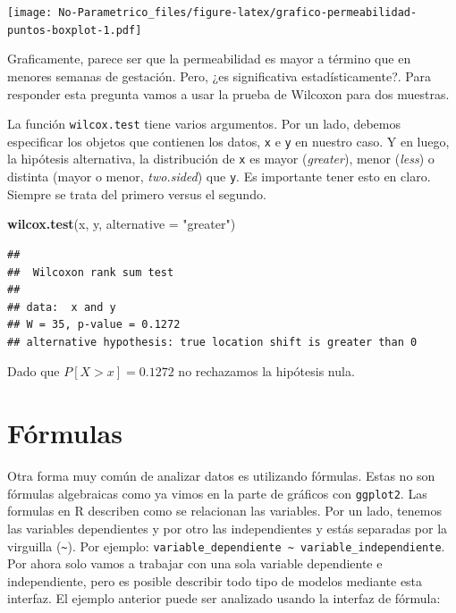 \documentclass[]{book}
\newenvironment{Shaded}{\begin{snugshade}}{\end{snugshade}}
\newcommand{\DataTypeTok}[1]{\textcolor[rgb]{0.13,0.29,0.53}{#1}}
\newcommand{\KeywordTok}[1]{\textcolor[rgb]{0.13,0.29,0.53}{\textbf{#1}}}
\newcommand{\NormalTok}[1]{#1}
\newcommand{\StringTok}[1]{\textcolor[rgb]{0.31,0.60,0.02}{#1}}
\theoremstyle{definition}
\theoremstyle{definition}
\theoremstyle{definition}
\theoremstyle{remark}
\begin{document}
\texttt{[image: No-Parametrico\_files/figure-latex/grafico-permeabilidad-puntos-boxplot-1.pdf]}

Graficamente, parece ser que la permeabilidad es mayor a término que en
menores semanas de gestación. Pero, ¿es significativa estadísticamente?.
Para responder esta pregunta vamos a usar la prueba de Wilcoxon para dos
muestras.

La función \texttt{wilcox.test} tiene varios argumentos. Por un lado,
debemos especificar los objetos que contienen los datos, \texttt{x} e
\texttt{y} en nuestro caso. Y en luego, la hipótesis alternativa, la
distribución de \texttt{x} es mayor (\emph{greater}), menor
(\emph{less}) o distinta (mayor o menor, \emph{two.sided}) que
\texttt{y}. Es importante tener esto en claro. Siempre se trata del
primero versus el segundo.

\begin{Shaded}
\begin{Highlighting}[]
\KeywordTok{wilcox.test}\NormalTok{(x, y, }\DataTypeTok{alternative =} \StringTok{"greater"}\NormalTok{)   }
\end{Highlighting}
\end{Shaded}

\begin{verbatim}
## 
##  Wilcoxon rank sum test
## 
## data:  x and y
## W = 35, p-value = 0.1272
## alternative hypothesis: true location shift is greater than 0
\end{verbatim}

Dado que \(P[X>x]=0.1272\) no rechazamos la hipótesis nula.

\hypertarget{formulas}{%
\section{Fórmulas}\label{formulas}}

Otra forma muy común de analizar datos es utilizando fórmulas. Estas no
son fórmulas algebraicas como ya vimos en la parte de gráficos con
\texttt{ggplot2}. Las formulas en R describen como se relacionan las
variables. Por un lado, tenemos las variables dependientes y por otro
las independientes y estás separadas por la virguilla
(\texttt{\textasciitilde{}}). Por ejemplo:
\texttt{variable\_dependiente\ \textasciitilde{}\ variable\_independiente}.
Por ahora solo vamos a trabajar con una sola variable dependiente e
independiente, pero es posible describir todo tipo de modelos mediante
esta interfaz. El ejemplo anterior puede ser analizado usando la
interfaz de fórmula:
\end{document}
